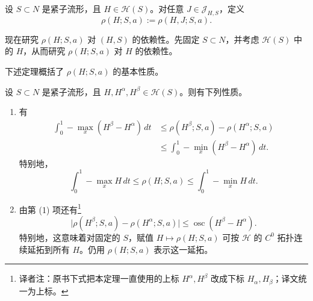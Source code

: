 \begin{definition}
\label{def:lagrangian-spectral-invariant}
设 $S\subset N$ 是紧子流形，且 $H\in\mathcal H(S)$。对任意 $J\in\mathcal J_{H,S}$，定义
\[
  \rho(H;S,a):=\rho(H,J;S,a).
\]
\end{definition}

现在研究 $\rho(H;S,a)$ 对 $(H,S)$ 的依赖性。先固定 $S\subset N$，并考虑 $\mathcal H(S)$ 中的 $H$，从而研究 $\rho(H;S,a)$ 对 $H$ 的依赖性。

下述定理概括了 $\rho(H;S,a)$ 的基本性质。

\begin{theorem}
\label{thm:basic-properties-lagrangian-spectral-invariant}
设 $S\subset N$ 是紧子流形，且 $H,H^\alpha,H^\beta\in\mathcal H(S)$。则有下列性质。
\begin{enumerate}[label=(\arabic*)]
  \item 有
  \begin{equation}
  \begin{split}
    \int_0^1-\max_x(H^\beta-H^\alpha)\,dt
    &\le\rho(H^\beta;S,a)-\rho(H^\alpha;S,a)\\
    &\le\int_0^1-\min_x(H^\beta-H^\alpha)\,dt.
  \end{split}
  \label{eq:spectral-invariant-lipschitz-two-hamiltonians}
  \end{equation}
  特别地，
  \begin{equation}
    \int_0^1-\max_xH\,dt
    \le\rho(H;S,a)
    \le\int_0^1-\min_xH\,dt.
  \label{eq:spectral-invariant-hamiltonian-bounds}
  \end{equation}
  \item 由第 (1) 项还有\footnote{译者注：原书下式把本定理一直使用的上标 $H^\alpha,H^\beta$ 改成下标 $H_\alpha,H_\beta$；译文统一为上标。}
  \[
    \bigl\lvert\rho(H^\beta;S,a)-\rho(H^\alpha;S,a)\bigr\rvert
    \le\operatorname{osc}(H^\beta-H^\alpha).
  \]
  特别地，这意味着对固定的 $S$，赋值 $H\longmapsto\rho(H;S,a)$ 可按 $\mathcal H$ 的 $C^0$ 拓扑连续延拓到所有 $H$。仍用 $\rho(H;S,a)$ 表示这一延拓。
\end{enumerate}
\end{theorem}

